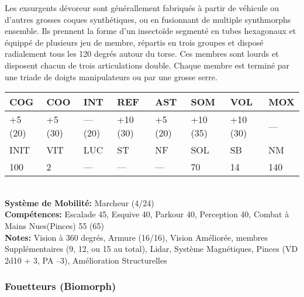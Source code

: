 Les exsurgents dévoreur sont générallement fabriqués à partir de véhicule ou d'autres grosses coques synthétiques, ou en fusionnant de multiple synthmorphs ensemble. Ils prennent la forme d'un insectoïde segmenté en tubes hexagonaux et équippé de plusieurs jeu de membre, répartis en trois groupes et disposé radialement tous les 120 degrés autour du torse. Ces membres sont lourds et disposent chacun de trois articulations double. Chaque membre est terminé par une triade de doigts manipulateurs ou par une grosse serre. \\ \begin{tabular}{|l|l|l|l|l|l|l|l|} \hline

COG &COO &INT &REF &AST &SOM &VOL &MOX \\ \hline

+5 (20) &+5 (30) &— (20) &+10 (30) &+5 (20) &+10 (35) &+10 (30) &— \\ \hline

INIT &VIT &LUC &ST &NF &SOL &SB &NM \\ \hline

100 &2 &— &— &— &70 &14 &140 \\ \hline

\end{tabular} \\ \textbf{Système de Mobilité:} Marcheur (4/24) \\ \textbf{Compétences:} Escalade 45, Esquive 40, Parkour 40, Perception 40, Combat à Mains Nues(Pinces) 55 (65) \\ \textbf{Notes: }Vision à 360 degrés, Armure (16/16), Vision Améliorée, membres Supplémentaires (9, 12, ou 15 au total), Lidar, Système Magnétiques, Pinces (VD 2d10 + 3, PA –3), Amélioration Structurelles 

\subsubsection{Fouetteurs (Biomorph)} 

